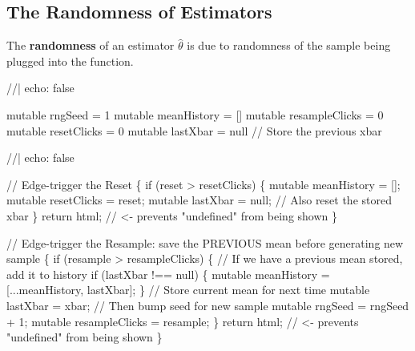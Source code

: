 \documentclass[
  letterpaper,
  DIV=11,
  numbers=noendperiod]{scrreprt}
\newenvironment{Shaded}{\begin{snugshade}}{\end{snugshade}}
\newcommand{\NormalTok}[1]{\textcolor[rgb]{0.00,0.23,0.31}{#1}}
\theoremstyle{definition}
\theoremstyle{plain}
\theoremstyle{definition}
\theoremstyle{remark}
\begin{document}
\subsection{The Randomness of
Estimators}\label{the-randomness-of-estimators}

The \textbf{randomness} of an estimator \(\hat{\theta}\) is due to
randomness of the sample being plugged into the function.

\begin{Shaded}
\begin{Highlighting}[]
\NormalTok{//| echo: false}

\NormalTok{mutable rngSeed = 1}
\NormalTok{mutable meanHistory = []}
\NormalTok{mutable resampleClicks = 0}
\NormalTok{mutable resetClicks = 0}
\NormalTok{mutable lastXbar = null  // Store the previous xbar}
\end{Highlighting}
\end{Shaded}

\begin{Shaded}
\begin{Highlighting}[]
\NormalTok{//| echo: false}

\NormalTok{// Edge{-}trigger the Reset}
\NormalTok{\{}
\NormalTok{  if (reset \textgreater{} resetClicks) \{}
\NormalTok{    mutable meanHistory = [];}
\NormalTok{    mutable resetClicks = reset;}
\NormalTok{    mutable lastXbar = null;  // Also reset the stored xbar}
\NormalTok{  \}}
\NormalTok{  return html\textasciigrave{}\textasciigrave{}; // \textless{}{-} prevents "undefined" from being shown}
\NormalTok{\}}

\NormalTok{// Edge{-}trigger the Resample: save the PREVIOUS mean before generating new sample}
\NormalTok{\{}
\NormalTok{  if (resample \textgreater{} resampleClicks) \{}
\NormalTok{    // If we have a previous mean stored, add it to history}
\NormalTok{    if (lastXbar !== null) \{}
\NormalTok{      mutable meanHistory = [...meanHistory, lastXbar];}
\NormalTok{    \}}
\NormalTok{    // Store current mean for next time}
\NormalTok{    mutable lastXbar = xbar;}
\NormalTok{    // Then bump seed for new sample}
\NormalTok{    mutable rngSeed = rngSeed + 1;}
\NormalTok{    mutable resampleClicks = resample;}
\NormalTok{  \}}
\NormalTok{  return html\textasciigrave{}\textasciigrave{}; // \textless{}{-} prevents "undefined" from being shown}
\NormalTok{\}}
\end{Highlighting}
\end{Shaded}
\end{document}
